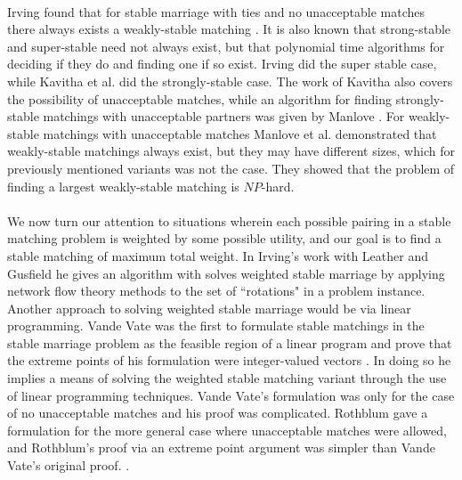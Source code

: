 \paragraph{}
Irving found that for stable marriage with ties and no unacceptable matches there always exists a weakly-stable matching \cite{irving1994stable}. It is also known that strong-stable and super-stable need not always exist, but that polynomial time algorithms for deciding if they do and finding one if so exist. Irving did the super stable case, while Kavitha et al. \cite{kavitha2004strongly} did the strongly-stable case. The work of Kavitha also covers the possibility of unacceptable matches, while an algorithm for finding strongly-stable matchings with unacceptable partners was given by Manlove \cite{manlove1999stable}. For weakly-stable matchings with unacceptable matches Manlove et al. \cite{manlove2002hard} demonstrated that weakly-stable matchings always exist, but they may have different sizes, which for previously mentioned variants was not the case. They showed that the problem of finding a largest weakly-stable matching is $NP$-hard.
\paragraph{}
We now turn our attention to situations wherein each possible pairing in a stable matching problem is weighted by some possible utility, and our goal is to find a stable matching of maximum total weight. In Irving's work with Leather and Gusfield \cite{irving1987efficient} he gives an algorithm with solves weighted stable marriage by applying network flow theory methods to the set of ``rotations" in a problem instance. Another approach to solving weighted stable marriage would be via linear programming. Vande Vate was the first to formulate stable matchings in the stable marriage problem as the feasible region of a linear program and prove that the extreme points of his formulation were integer-valued vectors \cite{vate1989linear}. In doing so he implies a means of solving the weighted stable matching variant through the use of linear programming techniques. Vande Vate's formulation was only for the case of no unacceptable matches and his proof was complicated. Rothblum gave a formulation for the more general case where unacceptable matches were allowed, and Rothblum's proof via an extreme point argument was simpler than Vande Vate's original proof. \cite{rothblum1992characterization}.
